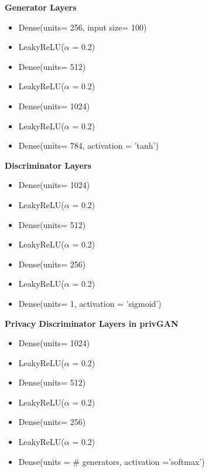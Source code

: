 \textbf{Generator Layers}
\begin{itemize}
\item Dense(units= 256, input size= 100)
\item  LeakyReLU($\alpha$ = 0.2)
\item Dense(units= 512)
\item  LeakyReLU($\alpha$ = 0.2)
\item Dense(units= 1024)
\item LeakyReLU($\alpha$ = 0.2)
\item  Dense(units= 784, activation = ’tanh’)
\end{itemize}

\textbf{Discriminator Layers}
\begin{itemize}

\item Dense(units= 1024)
\item LeakyReLU($\alpha$ = 0.2)
\item Dense(units= 512)
\item LeakyReLU($\alpha$ = 0.2)
\item Dense(units= 256)
\item LeakyReLU($\alpha$ = 0.2)
\item Dense(units= 1, activation = ’sigmoid’)
\end{itemize}



\textbf{Privacy Discriminator Layers in privGAN}
\begin{itemize}

\item Dense(units= 1024)
\item LeakyReLU($\alpha$ = 0.2)
\item Dense(units= 512)
\item LeakyReLU($\alpha$ = 0.2)
\item Dense(units= 256)
\item LeakyReLU($\alpha$ = 0.2)
\item Dense(units = \# generators, activation =’softmax’)
\end{itemize}


